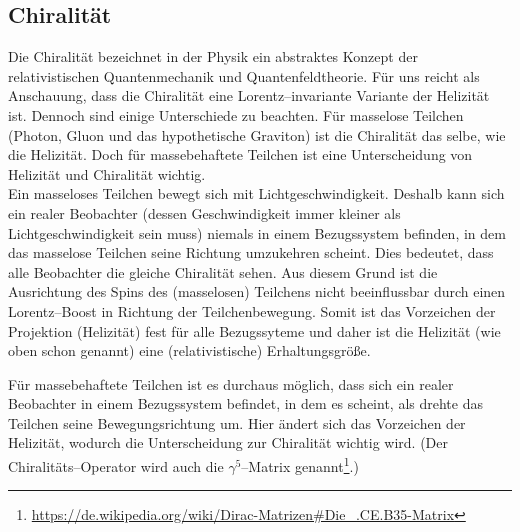 \documentclass[Ex4_Zusammenfassung.tex]{subfiles}
\begin{document}
\subsection{Chiralität}
Die Chiralität bezeichnet in der Physik ein abstraktes Konzept der relativistischen Quantenmechanik und Quantenfeldtheorie. Für uns reicht als Anschauung, dass die Chiralität eine Lorentz--invariante Variante der Helizität ist. Dennoch sind einige Unterschiede zu beachten. Für masselose Teilchen (Photon, Gluon und das hypothetische Graviton) ist die Chiralität das selbe, wie die Helizität. Doch für massebehaftete Teilchen ist eine Unterscheidung von Helizität und Chiralität wichtig.\\

Ein masseloses Teilchen bewegt sich mit Lichtgeschwindigkeit. Deshalb kann sich ein realer Beobachter (dessen Geschwindigkeit immer kleiner als Lichtgeschwindigkeit sein muss) niemals in einem Bezugssystem befinden, in dem das masselose Teilchen seine Richtung umzukehren scheint. Dies bedeutet, dass alle Beobachter die gleiche Chiralität sehen. Aus diesem Grund ist die Ausrichtung des Spins des (masselosen) Teilchens nicht beeinflussbar durch einen Lorentz--Boost in Richtung der Teilchenbewegung. Somit ist das Vorzeichen der Projektion (Helizität) fest für alle Bezugssyteme und daher ist die Helizität (wie oben schon genannt) eine (relativistische) Erhaltungsgröße. 

Für massebehaftete Teilchen ist es durchaus möglich, dass sich ein realer Beobachter in einem Bezugssystem befindet, in dem es scheint, als drehte das Teilchen seine Bewegungsrichtung um. Hier ändert sich das Vorzeichen der Helizität, wodurch die Unterscheidung zur Chiralität wichtig wird. (Der Chiralitäts--Operator wird auch die $\gamma^5$--Matrix genannt\footnote{\href{https://de.wikipedia.org/wiki/Dirac-Matrizen\#Die\_.CE.B35-Matrix}{https://de.wikipedia.org/wiki/Dirac-Matrizen\#Die\_.CE.B35-Matrix}}.)
\end{document}
